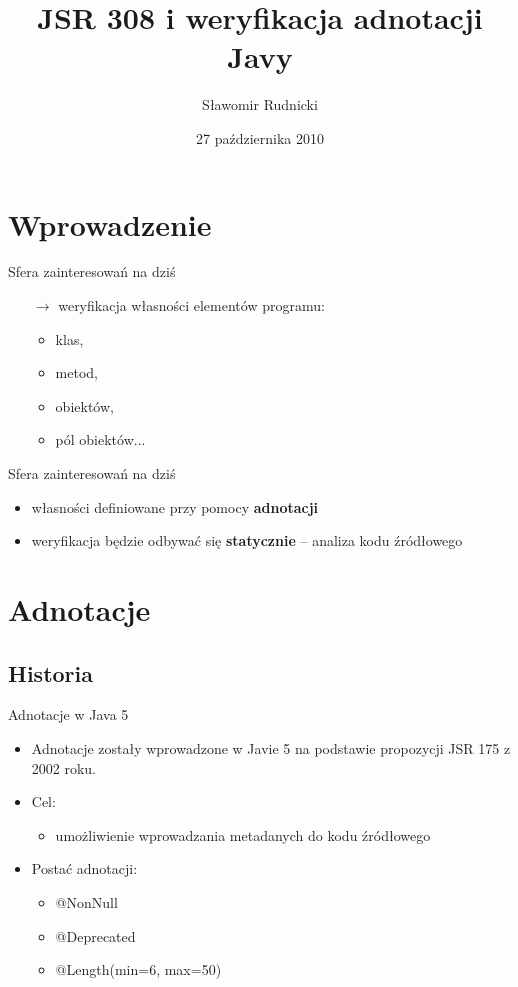 \documentclass{beamer}
\title{JSR 308 i weryfikacja adnotacji Javy}
\author{Sławomir Rudnicki}
\institute{Niezawodność systemów współbieżnych i obiektowych}
\date{27 października 2010}
\begin{document}
\begin{frame}
  \titlepage
\end{frame}
\begin{frame}
  \tableofcontents
\end{frame}

\section{Wprowadzenie}

\begin{frame}{Sfera zainteresowań na dziś}
\begin{itemize}
\item[$\rightarrow$] weryfikacja własności elementów programu:
\begin{itemize}
\item klas, 
\item metod, 
\item obiektów, 
\item pól obiektów...
\end{itemize}
\end{itemize}
\end{frame}

\begin{frame}{Sfera zainteresowań na dziś}
\begin{itemize}
\item<1->[$\rightarrow$] własności definiowane przy pomocy \textbf{adnotacji}
\begin{center}

\end{center}
\item<2->[$\rightarrow$] weryfikacja będzie odbywać się \textbf{statycznie} -- analiza kodu źródłowego
\end{itemize}
\end{frame}

\section{Adnotacje}
\subsection{Historia}
\begin{frame}{Adnotacje w Java 5}
\begin{itemize}
\item<1-> Adnotacje zostały wprowadzone w Javie 5 na podstawie propozycji
  JSR 175 z 2002 roku.
\item<2-> Cel: 
\begin{itemize}
\item umożliwienie wprowadzania metadanych do kodu źródłowego
\end{itemize}
\item<3-> Postać adnotacji: 
\begin{itemize}
\item \color{red} @NonNull 
\item \color{red} @Deprecated
\item \color{red} @Length(min=6, max=50)
\end{itemize}
\end{itemize}
\end{frame}
\end{document}
